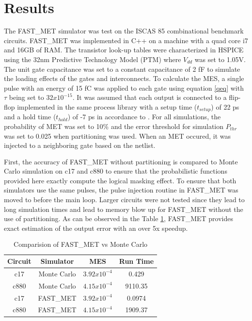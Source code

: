 \section{Results} \label{ch3:results}

The FAST\_MET simulator was test on the ISCAS 85 combinational benchmark circuits. FAST\_MET was implemented in C++ on a machine with a quad core i7 and 16GB of RAM. The transistor look-up tables were characterized in HSPICE using the 32nm Predictive Technology Model (PTM) \cite{PTM} where $V_{dd}$ was set to 1.05V. The unit gate capacitance was set to a constant capacitance of 2 fF to simulate the loading effects of the gates and interconnects. To calculate the MES, a single pulse with an energy of 15 fC was applied to each gate using equation \ref{qeq} with $\tau$ being set to $32x10^{-15}$. It was assumed that each output is connected to a flip-flop implemented in the same process library with a setup time ($t_{setup}$) of 22 ps and a hold time ($t_{hold}$) of -7 ps in accordance to \cite{Nunes2013}. For all simulations, the probability of MET was set to 10\% and the error threshold for simulation $P_{thr}$ was set to 0.025 when partitioning was used. When an MET occured, it was injected to a neighboring gate based on the netlist.

First, the accuracy of FAST\_MET without partitioning is compared to Monte Carlo simulation on c17 and c880 to ensure that the probabilistic functions provided here exactly compute the logical masking effect. To ensure that both simulators use the same pulses, the pulse injection routine in FAST\_MET was moved to before the main loop. Larger circuits were not tested since they lead to long simulation times and lead to memory blow up for FAST\_MET without the use of partitioning. As can be observed in the Table \ref{table:MCvFAST}, FAST\_MET provides exact estimation of the output error with an over 5x speedup.

\begin{table}[ht]
	\begin{center}
		\caption{Comparision of FAST\_MET vs Monte Carlo}
		\label{table:MCvFAST}
		\begin{tabular}{|c|c|c|c|}
			\hline
			Circuit& Simulator & MES & Run Time\\ 
			\hline
			c17 & Monte Carlo & $3.92x10^{-4}$ & 0.429\\
			\hline
			c880 & Monte Carlo & $4.15x10^{-4}$ & 9110.35\\
			\hline
			c17 & FAST\_MET & $3.92x10^{-4}$ & 0.0974\\
			\hline
			c880 & FAST\_MET & $4.15x10^{-4}$ & 1909.37\\
			\hline
		\end{tabular}
	\end{center}
\end{table}

